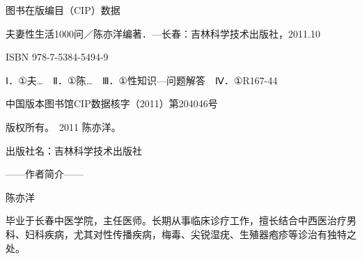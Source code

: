 \begin{enumerate}
\newpage
\thispagestyle{empty}
\begin{center}
    \vspace*{8cm}
    \song{} 图书在版编目（CIP）数据\par
    \vspace{0.5em}
    \song{} 夫妻性生活1000问／陈亦洋编著．—长春：吉林科学技术出版社，2011.10\par
    \vspace{0.5em}
    \song{} ISBN 978-7-5384-5494-9\par
    \vspace{0.5em}
    \song{} Ⅰ．①夫…　Ⅱ．①陈…　Ⅲ．①性知识—问题解答　Ⅳ．①R167-44\par
    \vspace{0.5em}
    \song{} 中国版本图书馆CIP数据核字（2011）第204046号\par
    \vspace{2em}
    \song{} 版权所有。\textcopyright\ 2011 陈亦洋。\par
    \vspace{0.5em}
    \song{} 出版社名：吉林科学技术出版社\par
\end{center}

\newpage
\thispagestyle{empty}
\begin{center}
    \vspace*{5cm}
    \hei{} ——作者简介——
\end{center}

\begin{center}
    \hei{} 陈亦洋
\end{center}

\vspace{1cm}
\begin{center}
    \song{} 毕业于长春中医学院，主任医师。长期从事临床诊疗工作，擅长结合中西医治疗男科、妇科疾病，尤其对性传播疾病，梅毒、尖锐湿疣、生殖器疱疹等诊治有独特之处。
\end{center}

\vspace{2cm}

\begin{abstract}
    本书介绍了女性生殖系统的结构、功能和相关知识。
    
\end{abstract}

\newpage
\tableofcontents

\mainmatter


\end{enumerate}
